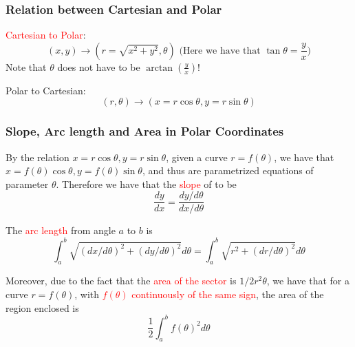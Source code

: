 \documentclass[12pt]{article}
\theoremstyle{definition}
\theoremstyle{definition}
\theoremstyle{remark}
\theoremstyle{definition}
\theoremstyle{definition}
\theoremstyle{definition}
\begin{document}
\subsubsection{Relation between Cartesian and Polar}

\textcolor{red}{Cartesian to Polar}: $$(x,y) \to (r= \sqrt{x^2 + y^2}, \theta) \text{ (Here we have that } \tan \theta = \frac{y}{x} \text{)}$$
Note that $\theta$ does not have to be $\arctan(\frac{y}{x})$!

Polar to Cartesian: $$(r,\theta) \to (x=r \cos \theta, y=r \sin \theta)$$

\subsubsection{Slope, Arc length and Area in Polar Coordinates}

By the relation $x=r \cos \theta, y=r \sin \theta$, given a curve $r=f(\theta)$, we have that $x=f(\theta) \cos \theta, y=f(\theta) \sin \theta$, and thus are parametrized equations of parameter $\theta$. Therefore we have that the \textcolor{red}{slope} of to be 
\[\frac{dy}{dx}=\frac{dy/d\theta}{dx/d\theta}\]

The \textcolor{red}{arc length} from angle $a$ to $b$ is $$\int_a^b \sqrt{(dx/d\theta)^2 + (dy/d\theta)^2} d\theta=\int_a^b \sqrt{r^2 + (dr/d\theta)^2} d\theta$$

Moreover, due to the fact that the \textcolor{red}{area of the sector} is $1/2 r^2 \theta$, we have that for a curve $r = f(\theta)$, with \textcolor{red}{$f(\theta)$ continuously of the same sign}, the area of the region enclosed is $$\frac{1}{2}\int^{b}_{a}f(\theta)^2 d\theta$$
\end{document}
